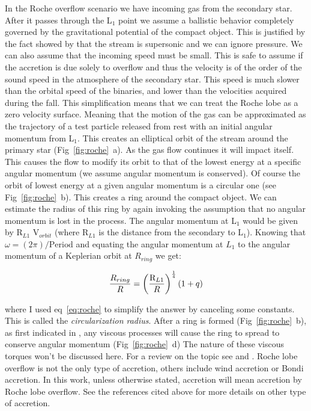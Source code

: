 In the Roche overflow scenario we have incoming gas from the secondary star. After it passes through the L$_1$ point we assume a ballistic behavior completely governed by the gravitational potential of the compact object. This is justified by the fact showed by \cite{lubow_gas_1975} that the stream is supersonic and we can ignore pressure. We can also assume that the incoming speed must be small. This is safe to assume if the accretion is due solely to overflow and thus the velocity is of the order of the sound speed in the atmosphere of the secondary star. This speed is much slower than the orbital speed of the binaries,  and lower than the velocities acquired during the fall. This simplification means that we can treat the Roche lobe as a zero velocity surface. Meaning that the motion of the gas can be approximated as the trajectory of a test particle released from rest with an initial angular momentum from L$_1$. This creates an elliptical orbit of the stream around the primary star (Fig~\ref{fig:roche}~a). As the gas flow continues it will impact itself. This causes the flow to modify its orbit to that of the lowest energy at a specific angular momentum (we assume angular momentum is conserved). Of course the orbit of lowest energy at a given angular momentum is a circular one (see Fig~\ref{fig:roche}~b). This creates a ring around the compact object.  We can estimate the radius of this ring by again invoking the assumption that no angular momentum is lost in the process. The angular momentum at L$_1$ would be given by  R$_{L1}$  V$_{orbit}$ (where R$_{L1}$ is the distance from the secondary to L$_1$). Knowing that $\omega = (2 \pi)/\text{Period}$ and equating the angular momentum at $L_1$ to the angular momentum of a Keplerian orbit at $R_{ring}$ we get:


\begin{equation}
        \frac{R_{ring}}{R} = \left ( \frac{\text R _{L1}}{R} \right ) ^{\frac{1}{4}} (1+q)
\end{equation}

where I used eq~\ref{eq:roche} to simplify the answer by canceling some constants. This is called the \emph{circularization radius}. After a ring is formed (Fig~\ref{fig:roche}~b), as first indicated in \cite{lynden-bell_evolution_1974}, any viscous processes will cause the ring to spread to conserve angular momentum (Fig~\ref{fig:roche}~d) The nature of these viscous torques won't be discussed here. For a review on the topic see \cite{frank_accretion_2002} and \cite{verbunt_accretion_1982}. Roche lobe overflow is not the only type of accretion, others include wind accretion or Bondi accretion. In this work, unless otherwise stated, accretion will mean accretion by Roche lobe overflow. See the references cited above for more details on other type of accretion. 


